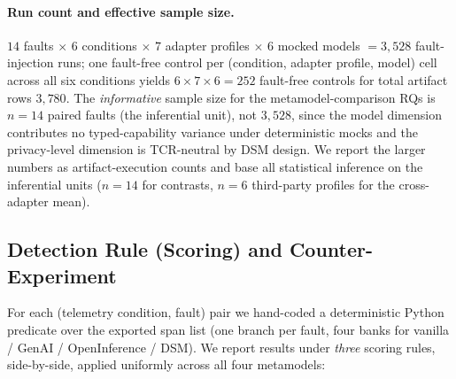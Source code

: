 \documentclass[a4paper,UKenglish,cleveref,autoref,thm-restate]{lipics-v2021}
\begin{document}
\paragraph*{Run count and effective sample size.}
$14$ faults $\times$ $6$ conditions $\times$ $7$ adapter profiles $\times$
$6$ mocked models $= 3{,}528$ fault-injection runs; one fault-free
control per (condition, adapter profile, model) cell across all six
conditions yields $6 \times 7 \times 6 = 252$ fault-free controls
for total artifact rows $3{,}780$.  The \emph{informative} sample
size for the metamodel-comparison RQs is $n = 14$ paired faults
(the inferential unit), not $3{,}528$, since the model dimension
contributes no typed-capability variance under deterministic mocks
and the privacy-level dimension is TCR-neutral by DSM design.  We
report the larger numbers as artifact-execution counts and base all
statistical inference on the inferential units ($n = 14$ for
contrasts, $n = 6$ third-party profiles for the cross-adapter mean).

\subsection{Detection Rule (Scoring) and Counter-Experiment}
\label{sec:scoring}

For each (telemetry condition, fault) pair we hand-coded a
deterministic Python predicate over the exported span list (one
branch per fault, four banks for vanilla / GenAI / OpenInference /
DSM).  We report results under \emph{three} scoring rules,
side-by-side, applied uniformly across all four metamodels:
\end{document}
